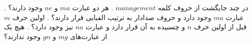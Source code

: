 \p
در چند جایگشت از حروف کلمه $management$
    .
    هر دو عبارت $ma$ و $ne$ وجود دارند؟
    .
    عبارت $ma$ وجود دارد و حروف صدادار به ترتیب الفبایی قرار دارند؟
    .
    اولین حرف $m$ قبل از اولین حرف $n$ و چسبیده به آن قرار دارد و عبارت $na$ نیز وجود دارد؟
    .
    هیچ یک از عبارت‌های $mg$ و $gn$ وجود ندارند؟
  